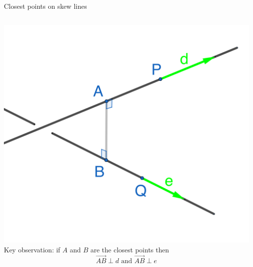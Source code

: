 \documentclass{beamer}
\begin{document}
\begin{frame}{Closest points on skew lines}
\begin{columns}
    \hspace{-1cm}
    \includegraphics[scale=0.3]{skwe-lines.png}
    Key observation: if $A$ and $B$ are the closest points then
    \begin{equation*}
    \overrightarrow {AB} \perp d\text{ and } \overrightarrow {AB} \perp e
    \end{equation*}
\end{columns}
\end{frame}
\end{document}
